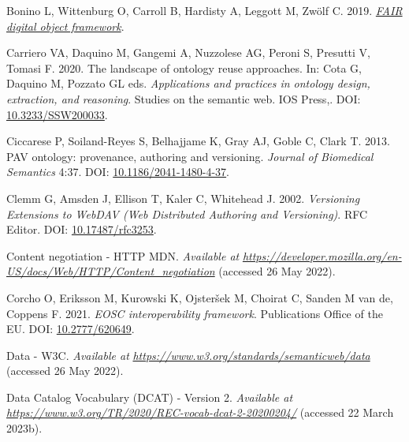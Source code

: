 \begin{CSLReferences}{1}{0}
\leavevmode{}%
Bonino L, Wittenburg O, Carroll B, Hardisty A, Leggott M, Zwölf C. 2019. \emph{\href{https://github.com/GEDE-RDA-Europe/GEDE/blob/master/FAIR\%20Digital\%20Objects/FDOF/FAIR\%20Digital\%20Object\%20Framework-v1-02.docx}{FAIR digital object framework}}.

\leavevmode{}%
Carriero VA, Daquino M, Gangemi A, Nuzzolese AG, Peroni S, Presutti V, Tomasi F. 2020. The landscape of ontology reuse approaches. In: Cota G, Daquino M, Pozzato GL eds. \emph{Applications and practices in ontology design, extraction, and reasoning}. Studies on the semantic web. IOS Press,. DOI: \href{https://doi.org/10.3233/SSW200033}{10.3233/SSW200033}.

\leavevmode{}%
Ciccarese P, Soiland-Reyes S, Belhajjame K, Gray AJ, Goble C, Clark T. 2013. PAV ontology: provenance, authoring and versioning. \emph{Journal of Biomedical Semantics} 4:37. DOI: \href{https://doi.org/10.1186/2041-1480-4-37}{10.1186/2041-1480-4-37}.

\leavevmode{}%
Clemm G, Amsden J, Ellison T, Kaler C, Whitehead J. 2002. \emph{Versioning Extensions to WebDAV (Web Distributed Authoring and Versioning)}. RFC Editor. DOI: \href{https://doi.org/10.17487/rfc3253}{10.17487/rfc3253}.

\leavevmode{}%
Content negotiation - HTTP \textbar{} MDN. \emph{Available at} \href{https://developer.mozilla.org/en-US/docs/Web/HTTP/Content_negotiation}{\emph{https://developer.mozilla.org/en-US/docs/Web/HTTP/Content\_negotiation}} (accessed 26 May 2022).

\leavevmode{}%
Corcho O, Eriksson M, Kurowski K, Ojsteršek M, Choirat C, Sanden M van de, Coppens F. 2021. \emph{EOSC interoperability framework}. Publications Office of the EU. DOI: \href{https://doi.org/10.2777/620649}{10.2777/620649}.

\leavevmode{}%
Data - W3C. \emph{Available at} \href{https://www.w3.org/standards/semanticweb/data}{\emph{https://www.w3.org/standards/semanticweb/data}} (accessed 26 May 2022).

\leavevmode{}%
Data Catalog Vocabulary (DCAT) - Version 2. \emph{Available at} \href{https://www.w3.org/TR/2020/REC-vocab-dcat-2-20200204/}{\emph{https://www.w3.org/TR/2020/REC-vocab-dcat-2-20200204/}} (accessed 22 March 2023b).


\end{CSLReferences}
